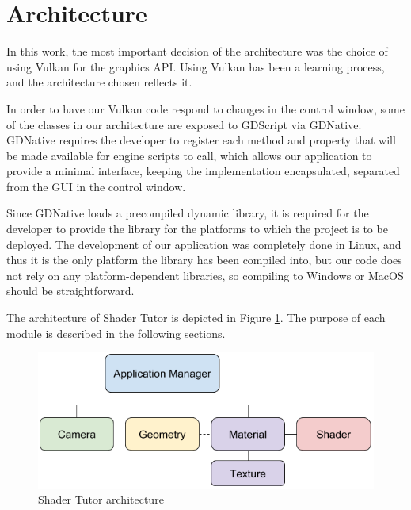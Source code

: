 \section{Architecture}
In this work, the most important decision of the architecture was the choice of using Vulkan for the graphics API. Using Vulkan has been a learning process, and the architecture chosen reflects it.

In order to have our Vulkan code respond to changes in the control window, some of the classes in our architecture are exposed to GDScript via GDNative. GDNative requires the developer to register each method and property that will be made available for engine scripts to call, which allows our application to provide a minimal interface, keeping the implementation encapsulated, separated from the GUI in the control window.

Since GDNative loads a precompiled dynamic library, it is required for the developer to provide the library for the platforms to which the project is to be deployed. The development of our application was completely done in Linux, and thus it is the only platform the library has been compiled into, but our code does not rely on any platform-dependent libraries, so compiling to Windows or MacOS should be straightforward.

The architecture of Shader Tutor is depicted in Figure \ref{fig:architecture}. The purpose of each module is described in the following sections.

\begin{figure}[h]
    \caption{Shader Tutor architecture}
    \begin{center}
        \includegraphics[width = 15cm]{figs/ShaderTutorArchitecture.png}
    \end{center}
    \label{fig:architecture}
\end{figure}












